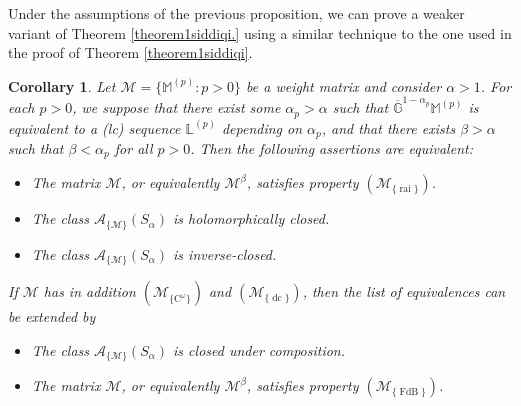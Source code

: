 \documentclass[11pt,a4paper]{article}
\theoremstyle{plain}
\newtheorem{theorem}[proposition]{Theorem}
\newtheorem{corollary}[proposition]{Corollary}
\theoremstyle{definition}
\newcommand{\M}{\mathbb{M}}
\newcommand{\LL}{\mathbb{L}}
\newcommand{\G}{\mathbb{G}}
\let\on=\operatorname
\begin{document}
{Under the assumptions of the previous proposition, we can prove a weaker variant of Theorem \ref{theorem1siddiqi.} using a similar technique to the one used in the proof of Theorem \ref{theorem1siddiqi}.}
\begin{corollary}
Let $\mathcal{M}=\{\M^{(p)}: p>0\}$ be a weight matrix and consider $\alpha> 1$. For each $p>0$, we suppose that there exist some $\alpha_p>\alpha$ such that $\overline{\G}^{1-\alpha_p}\M^{(p)}$ is equivalent to a (lc) sequence $\LL^{(p)}$ depending on $\alpha_p$, {and that there exists $\beta>\alpha$ such that $\beta<\alpha_p$ for all $p>0$}. Then the following assertions are equivalent:
	\begin{itemize}
		\item[$(a)$] The matrix $\mathcal{M}$, {or equivalently $\mathcal{M}^\beta$}, satisfies property \hyperlink{R-rai}{$(\mathcal{M}_{\{\on{rai}\}})$}.
		
		\item[$(b)$] The class $\mathcal{A}_{\{\mathcal{M}\}}(S_{\alpha})$ is holomorphically closed.
		
		
		\item[$(c)$] The class $\mathcal{A}_{\{\mathcal{M}
			\}}(S_{\alpha})$ is inverse-closed.
		
	\end{itemize}
	If $\mathcal{M}$ has in addition \hyperlink{R-Comega}{$(\mathcal{M}_{\{\text{C}^{\omega}\}})$} and \hyperlink{R-dc}{$(\mathcal{M}_{\{\on{dc}\}})$}, then the list of equivalences can be extended by
	
	\begin{itemize}
		\item[$(d)$] The class $\mathcal{A}_{\{\mathcal{M}\}}(S_{\alpha})$ is closed under composition.
		
		\item[$(e)$] The matrix $\mathcal{M}$, {or equivalently $\mathcal{M}^\beta$}, satisfies  property \hyperlink{R-FdB}{$(\mathcal{M}_{\{\on{FdB}\}})$}.
	\end{itemize}
\end{corollary}
%
%
\end{document}
